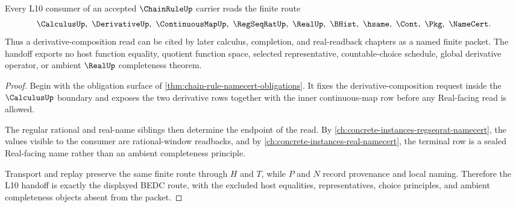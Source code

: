\begin{theorem}
\label{thm:chain-rule-l10-handoff}
Every L10 consumer of an accepted $\ChainRuleUp$ carrier reads the finite route
$$
\CalculusUp,\ \DerivativeUp,\ \ContinuousMapUp,\ \RegSeqRatUp,\ \RealUp,\ \BHist,\ \hsame,\ \Cont,\ \Pkg,\ \NameCert .
$$
Thus a derivative-composition read can be cited by later calculus, completion, and real-readback chapters as a named finite packet. The handoff exports no host function equality, quotient function space, selected representative, countable-choice schedule, global derivative operator, or ambient $\RealUp$ completeness theorem.
\end{theorem}
\begin{proof}
Begin with the obligation surface of \autoref{thm:chain-rule-namecert-obligations}. It fixes the derivative-composition request inside the $\CalculusUp$ boundary and exposes the two derivative rows together with the inner continuous-map row before any Real-facing read is allowed.

The regular rational and real-name siblings then determine the endpoint of the read. By \autoref{ch:concrete-instances-regseqrat-namecert}, the values visible to the consumer are rational-window readbacks, and by \autoref{ch:concrete-instances-real-namecert}, the terminal row is a sealed Real-facing name rather than an ambient completeness principle.

Transport and replay preserve the same finite route through $H$ and $T$, while $P$ and $N$ record provenance and local naming. Therefore the L10 handoff is exactly the displayed BEDC route, with the excluded host equalities, representatives, choice principles, and ambient completeness objects absent from the packet.
\end{proof}



